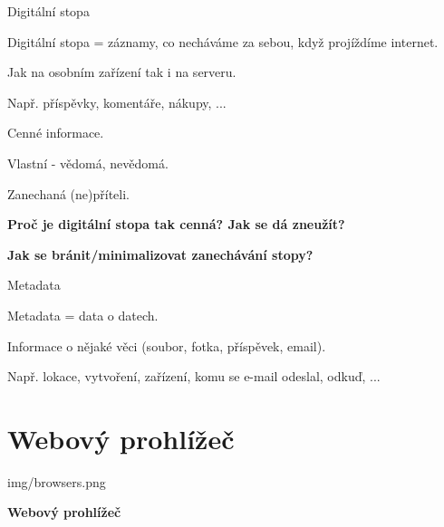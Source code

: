 \documentclass[aspectratio=1610]{beamer}
\begin{document}
\begin{frame}{Digitální stopa}
    \begin{cardTiny}
        \begin{flushleft}
            Digitální stopa = záznamy, co necháváme za sebou, když projíždíme internet.

            Jak na osobním zařízení tak i na serveru.

            Např. příspěvky, komentáře, nákupy, ...

            Cenné informace.

            \vspace{2ex}

            Vlastní - vědomá, nevědomá.

            Zanechaná (ne)příteli.
        \end{flushleft}
    \end{cardTiny}
    \begin{cardTiny}
        \begin{center}
            \textbf{Proč je digitální stopa tak cenná? Jak se dá zneužít?}
        \end{center}
    \end{cardTiny}
    \begin{cardTiny}
        \begin{center}
            \textbf{Jak se bránit/minimalizovat zanechávání stopy?}
        \end{center}
    \end{cardTiny}
\end{frame}

\begin{frame}{Metadata}
    \begin{cardTiny}
        \begin{flushleft}
            Metadata = data o datech.

            Informace o nějaké věci (soubor, fotka, příspěvek, email).

            Např. lokace, vytvoření, zařízení, komu se e-mail odeslal, odkuď, ...
        \end{flushleft}
    \end{cardTiny}
\end{frame}


\section{Webový prohlížeč}

\begin{frameImg}[width]{img/browsers.png}
    \vspace*{60mm}
    \begin{cardTiny}
        \vspace*{\fill}
        \begin{center}
            \textbf{Webový prohlížeč}
        \end{center}
    \end{cardTiny}
\end{frameImg}
\end{document}
